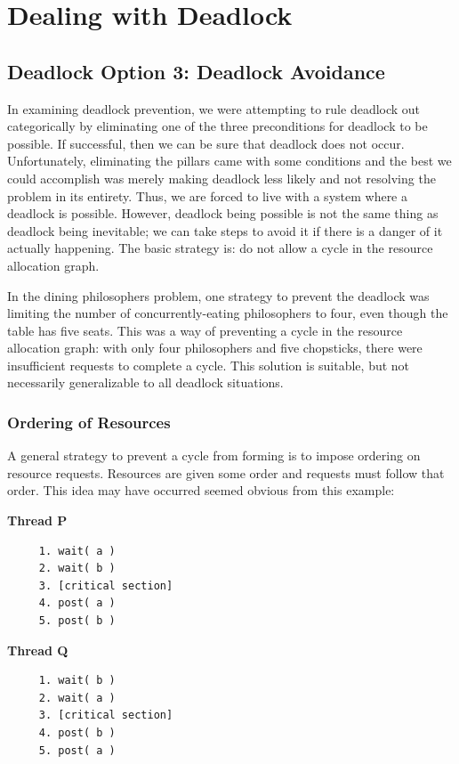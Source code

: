 




\section*{Dealing with Deadlock}

\subsection*{Deadlock Option 3: Deadlock Avoidance}
In examining deadlock prevention, we were attempting to rule deadlock out categorically by eliminating one of the three preconditions for deadlock to be possible. If successful, then we can be sure that deadlock does not occur. Unfortunately, eliminating the pillars came with some conditions and the best we could accomplish was merely making deadlock less likely and not resolving the problem in its entirety. Thus, we are forced to live with a system where a deadlock is possible. However, deadlock being possible is not the same thing as deadlock being inevitable; we can take steps to avoid it if there is a danger of it actually happening. The basic strategy is: do not allow a cycle in the resource allocation graph.

In the dining philosophers problem, one strategy to prevent the deadlock was limiting the number of concurrently-eating philosophers to four, even though the table has five seats. This was a way of preventing a cycle in the resource allocation graph: with only four philosophers and five chopsticks, there were insufficient requests to complete a cycle. This solution is suitable, but not necessarily generalizable to all deadlock situations.

\subsubsection*{Ordering of Resources}
A general strategy to prevent a cycle from forming is to impose ordering on resource requests. Resources are given some order and requests must follow that order. This idea may have occurred seemed obvious from this example: 

\begin{multicols}{2}
\textbf{Thread P}\vspace{-2em}
  \begin{verbatim}
	 1. wait( a ) 
	 2. wait( b )
	 3. [critical section]
	 4. post( a )
	 5. post( b )
  \end{verbatim}
\columnbreak
\textbf{Thread Q}\vspace{-2em}
  \begin{verbatim}
	 1. wait( b ) 
	 2. wait( a )
	 3. [critical section]
	 4. post( b )
	 5. post( a )
  \end{verbatim}
\end{multicols}
\vspace{-2em}

